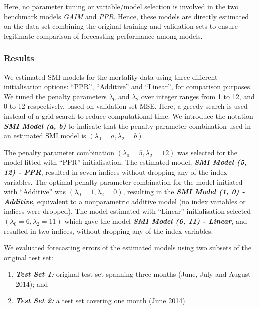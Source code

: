 \documentclass[
  11pt,
  a4paper,
]{report}
\providecommand{\tightlist}{%
  \setlength{\itemsep}{0pt}\setlength{\parskip}{0pt}}\usepackage{longtable,booktabs,array}
\begin{document}
Here, no parameter tuning or variable/model selection is involved in the
two benchmark models \emph{GAIM} and \emph{PPR}. Hence, these models are
directly estimated on the data set combining the original training and
validation sets to ensure legitimate comparison of forecasting
performance among models.

\subsubsection{Results}\label{results}

We estimated SMI models for the mortality data using three different
initialisation options: ``PPR'', ``Additive'' and ``Linear'', for
comparison purposes. We tuned the penalty parameters \(\lambda_{0}\) and
\(\lambda_{2}\) over integer ranges from 1 to 12, and 0 to 12
respectively, based on validation set MSE. Here, a greedy search is used
instead of a grid search to reduce computational time. We introduce the
notation \textbf{\emph{SMI Model (a, b)}} to indicate that the penalty
parameter combination used in an estimated SMI model is
\((\lambda_{0} = a, \lambda_{2} = b)\).

The penalty parameter combination
\((\lambda_{0} = 5, \lambda_{2} = 12)\) was selected for the model
fitted with ``PPR'' initialisation. The estimated model,
\textbf{\emph{SMI Model (5, 12) - PPR}}, resulted in seven indices
without dropping any of the index variables. The optimal penalty
parameter combination for the model initiated with ``Additive'' was
\((\lambda_{0} = 1, \lambda_{2} = 0)\), resulting in the
\textbf{\emph{SMI Model (1, 0) - Additive}}, equivalent to a
nonparametric additive model (no index variables or indices were
dropped). The model estimated with ``Linear'' initialisation selected
\((\lambda_{0} = 6, \lambda_{2} = 11)\) which gave the model
\textbf{\emph{SMI Model (6, 11) - Linear}}, and resulted in two indices,
without dropping any of the index variables.

We evaluated forecasting errors of the estimated models using two
subsets of the original test set:

\begin{enumerate}
\def\labelenumi{\arabic{enumi}.}
\tightlist
\item
  \textbf{\emph{Test Set 1:}} original test set spanning three months
  (June, July and August 2014); and
\item
  \textbf{\emph{Test Set 2:}} a test set covering one month (June 2014).
\end{enumerate}
\end{document}
